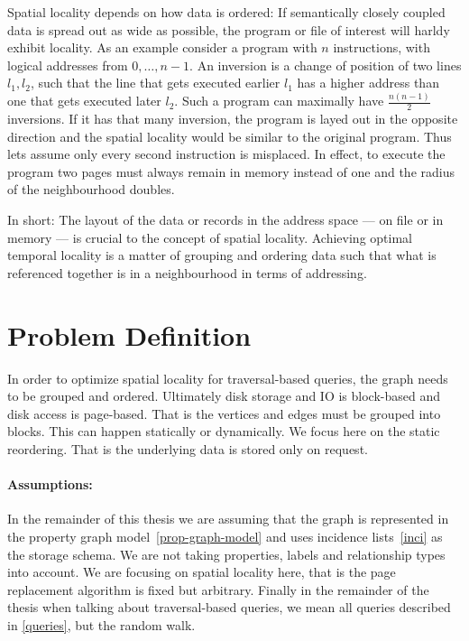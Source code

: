     Spatial locality depends on how data is ordered:
    If semantically closely coupled data is spread out as wide as possible, the program or file of interest will harldy exhibit locality. 
    As an example consider a program with $n$ instructions, with logical addresses from $0, \dots, n-1$. 
    An inversion is a change of position of two lines $l_1, l_2$, such that the line that gets executed earlier $l_1$ has a higher address than one that gets executed later $l_2$.
    Such a program can maximally have $\frac{n (n-1)}{2}$ inversions. 
    If it has that many inversion, the program is layed out in the opposite direction and the spatial locality would be similar to the original program.
    Thus lets assume only every second instruction is misplaced. 
    In effect, to execute the program two pages must always remain in memory instead of one and the radius of the neighbourhood doubles.
    
    In short: 
    The layout of the data or records in the address space --- on file or in memory --- is crucial to the concept of spatial locality. 
    Achieving optimal temporal locality is a matter of grouping and ordering data such that what is referenced together is in a neighbourhood in terms of addressing.
    
          
\section{Problem Definition}\label{prob-def}
    In order to optimize spatial locality for traversal-based queries, the graph needs to be grouped and ordered.
    Ultimately disk storage and IO is block-based and disk access is page-based. 
    That is the vertices and edges must be grouped into blocks.
    This can happen statically or dynamically. 
    We focus here on the static reordering.
    That is the underlying data is stored only on request.
    
    \paragraph{Assumptions:}
    In the remainder of this thesis we are assuming that the graph is represented in the property graph model~\ref{prop-graph-model} and uses incidence lists~\ref{inci} as the storage schema. 
    We are not taking properties, labels and relationship types into account.
    We are focusing on spatial locality here, that is the page replacement algorithm is fixed but arbitrary.
    Finally in the remainder of the thesis when talking about traversal-based queries, we mean all queries described in \ref{queries}, but the random walk.
    
